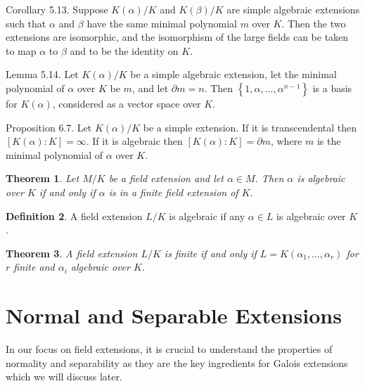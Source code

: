 \documentclass[12pt]{article}
\newtheorem{theorem}{Theorem}
\theoremstyle{definition}
\newtheorem{definition}[theorem]{Definition}
\begin{document}

Corollary 5.13. Suppose $K(\alpha) / K$ and $K(\beta) / K$ are simple algebraic extensions such that $\alpha$ and $\beta$ have the same minimal polynomial $m$ over $K$. Then the two extensions are isomorphic, and the isomorphism of the large fields can be taken to map $\alpha$ to $\beta$ and to be the identity on $K$.

Lemma 5.14. Let $K(\alpha) / K$ be a simple algebraic extension, let the minimal polynomial of $\alpha$ over $K$ be $m$, and let $\partial m=n$. Then $\left\{1, \alpha, \ldots, \alpha^{n-1}\right\}$ is a basis for $K(\alpha)$, considered as a vector space over $K$.

Proposition 6.7. Let $K(\alpha) / K$ be a simple extension. If it is transcendental then $[K(\alpha): K]=\infty$. If it is algebraic then $[K(\alpha): K]=\partial m$, where $m$ is the minimal polynomial of $\alpha$ over $K$.


\begin{theorem}
    Let $M/K$ be a field extension and let $\alpha \in M$. Then $\alpha$ is algebraic over $K$ if and only if $\alpha$ is in a finite field extension of $K$. 
\end{theorem}

\begin{definition}
    A field extension $L/K$ is algebraic if any $\alpha \in L$ is algebraic over $K$. 
\end{definition}

\begin{theorem} \label{thm:finite-equi-def}
    A field extension $L/K$ is finite if and only if $L = K(\alpha_1, \dots, \alpha_r)$ for $r$ finite and $\alpha_i$ algebraic over $K$. 
\end{theorem}






\section{Normal and Separable Extensions}
In our focus on field extensions, it is crucial to understand the properties of normality and separability as they are the key ingredients for Galois extensions which we will discuss later.
\end{document}
